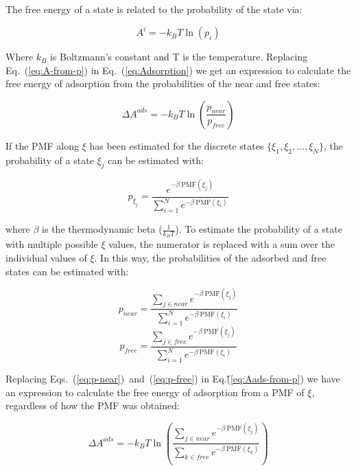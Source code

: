 \documentclass[twoside,twocolumn,9pt]{article}
\begin{document}
The free energy of a state is related to the probability of the state
via:

\begin{equation}
\label{eq:A-from-p}
A^i = - k_B T \ln (p_i)
\end{equation}

Where $k_B$ is Boltzmann's constant and T is the
temperature. Replacing Eq.~(\ref{eq:A-from-p}) in
Eq.~(\ref{eq:Adsorption}) we get an expression to calculate the free
energy of adsorption from the probabilities of the near and free
states:

\begin{equation}
\label{eq:Aads-from-p}
\Delta A^{ads} = - k_B T \ln (\frac{p_{near}}{p_{free}})
\end{equation}

If the PMF along $\xi$ has been estimated for the discrete
states $\{\xi_1, \xi_2, ..., \xi_N \}$, the probability of a state
$\xi_{j}$ can be estimated with:

\begin{equation}
\label{eq:p-from-PMF}
p_{\xi_j} = \frac{e^{-\beta~\mathrm{PMF}(\xi_j)}}{\sum_{i=1}^N e^{-\beta~\mathrm{PMF}(\xi_i)}}
\end{equation}

where $\beta$ is the thermodynamic beta ($\frac{1}{k_{B}T}$). To
estimate the probability of a state with multiple possible $\xi$
values, the numerator is replaced with a sum over the individual
values of $\xi$. In this way, the probabilities of the adsorbed and
free states can be estimated with:

\begin{equation}
\label{eq:p-near}
p_{near} = \frac{\sum_{j \in near} e^{-\beta~\mathrm{PMF}(\xi_j)}}{\sum_{i=1}^N e^{-\beta~\mathrm{PMF}(\xi_i)}}
\end{equation}
\begin{equation}
\label{eq:p-free}
p_{free} = \frac{\sum_{j \in free} e^{-\beta~\mathrm{PMF}(\xi_j)}}{\sum_{i=1}^N e^{-\beta~\mathrm{PMF}(\xi_i)}}
\end{equation}

Replacing Eqs.~(\ref{eq:p-near})~and~(\ref{eq:p-free}) in
Eq.\~(\ref{eq:Aads-from-p}) we have an expression to calculate the
free energy of adsorption from a PMF of $\xi$, regardless of how the
PMF was obtained:

\begin{equation}
\label{eq:Aads-from-PMF}
\Delta A^{ads} = - k_B T \ln \left(\frac{\sum_{j \in near} e^{-\beta~\mathrm{PMF}(\xi_j)}}{\sum_{k \in free} e^{-\beta~\mathrm{PMF}(\xi_k)}}\right)
\end{equation}
\end{document}
